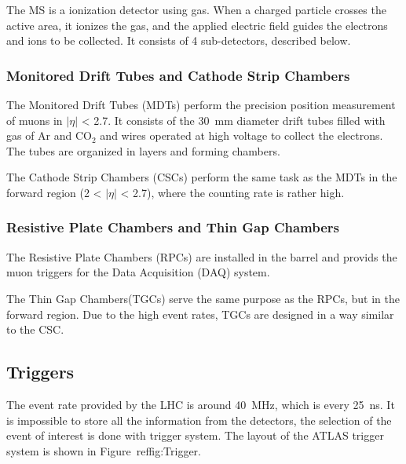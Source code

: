 The MS is a ionization detector using gas. When a charged particle crosses the active area, it ionizes the gas, and the applied electric field guides the electrons and ions to be collected. It consists of 4 sub-detectors, described below.

\subsubsection{Monitored Drift Tubes and Cathode Strip Chambers}
The Monitored Drift Tubes (MDTs) perform the precision position measurement of muons 
in $|\eta|$ < 2.7. It consists of the 30~mm diameter drift tubes filled with gas of Ar and CO$_2$ and wires operated at high voltage to collect the electrons.
The tubes are organized in layers and forming chambers.

The Cathode Strip Chambers (CSCs) perform the same task as the MDTs in the forward region (2 < $|\eta|$ < 2.7), where the counting rate is rather high. 

\subsubsection{Resistive Plate Chambers and Thin Gap Chambers}
The Resistive Plate Chambers (RPCs) are installed in the barrel and provids the muon triggers for the Data Acquisition (DAQ) system.

The Thin Gap Chambers(TGCs) serve the same purpose as the RPCs, but in the forward region. Due to the high event rates, TGCs are designed in a way similar to the CSC.

\subsection{Triggers}
The event rate provided by the LHC is around 40~MHz, which is every 25~ns. It is impossible to store all the information from the detectors, the selection of the event of interest is done with trigger system. The layout of the ATLAS trigger system is shown in Figure~ref{fig:Trigger}.

